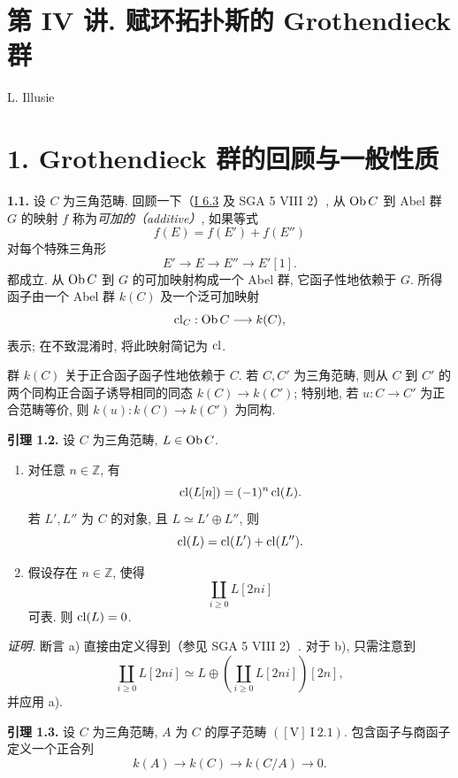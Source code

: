 \section*{第 IV 讲. 赋环拓扑斯的 Grothendieck 群}
\begin{center}
L. Illusie
\end{center}

\section*{1. Grothendieck 群的回顾与一般性质}

\textbf{1.1.} 设 \(C\) 为三角范畴. 回顾一下（\hyperlink{sga6.e01.para.6-3}{I 6.3} 及 SGA 5 VIII 2）, 从 \(\operatorname{Ob} C\) 到 Abel 群 \(G\) 的映射 \(f\) 称为\emph{可加的（additive）}, 如果等式
\[
 f(E)=f(E')+f(E'')
\]
对每个特殊三角形
\[
 E'\longrightarrow E\longrightarrow E''\longrightarrow E'[1].
\]
都成立. 从 \(\operatorname{Ob} C\) 到 \(G\) 的可加映射构成一个 Abel 群, 它函子性地依赖于 \(G\). 所得函子由一个 Abel 群 \(k(C)\) 及一个泛可加映射
\[
 \operatorname{cl}_C:\operatorname{Ob} C\longrightarrow k(C),
\]
表示; 在不致混淆时, 将此映射简记为 \(\operatorname{cl}\).

群 \(k(C)\) 关于正合函子函子性地依赖于 \(C\). 若 \(C,C'\) 为三角范畴, 则从 \(C\) 到 \(C'\) 的两个同构正合函子诱导相同的同态 \(k(C)\to k(C')\); 特别地, 若 \(u:C\to C'\) 为正合范畴等价, 则 \(k(u):k(C)\to k(C')\) 为同构.

\textbf{引理 1.2.} 设 \(C\) 为三角范畴, \(L\in\operatorname{Ob} C\).
\begin{enumerate}[label=\alph*)]
\item 对任意 \(n\in\mathbb Z\), 有
\[
 \operatorname{cl}(L[n])=(-1)^n\operatorname{cl}(L).
\]
若 \(L',L''\) 为 \(C\) 的对象, 且 \(L\simeq L'\oplus L''\), 则
\[
 \operatorname{cl}(L)=\operatorname{cl}(L')+\operatorname{cl}(L'').
\]
\item 假设存在 \(n\in\mathbb Z\), 使得
\[
 \coprod_{i\geq0} L[2ni]
\]
可表. 则 \(\operatorname{cl}(L)=0\).
\end{enumerate}

\emph{证明.} 断言 a) 直接由定义得到（参见 SGA 5 VIII 2）. 对于 b), 只需注意到
\[
 \coprod_{i\geq0} L[2ni]\simeq
 L\oplus\left(\coprod_{i\geq0}L[2ni]\right)[2n],
\]
并应用 a).

\textbf{引理 1.3.} 设 \(C\) 为三角范畴, \(A\) 为 \(C\) 的厚子范畴 \(([\mathrm V]\ \mathrm{I}\ 2.1)\). 包含函子与商函子定义一个正合列
\[
 k(A)\longrightarrow k(C)\longrightarrow k(C/A)\longrightarrow 0.
\]

